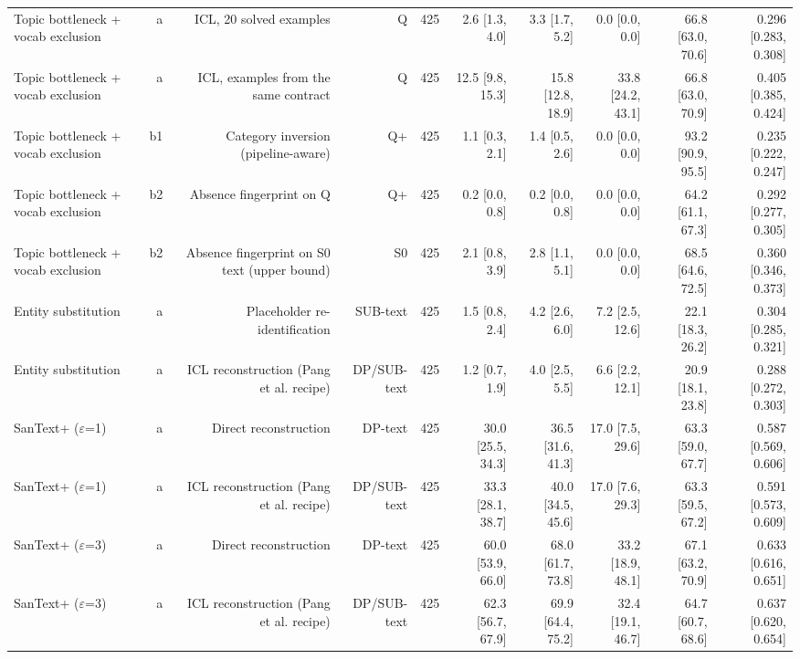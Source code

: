 \begin{table}[t]
\begin{tabular}{lrrrrrrrrr}
Topic bottleneck + vocab exclusion & a & ICL, 20 solved examples & Q & 425 & 2.6 [1.3, 4.0] & 3.3 [1.7, 5.2] & 0.0 [0.0, 0.0] & 66.8 [63.0, 70.6] & 0.296 [0.283, 0.308] \\
Topic bottleneck + vocab exclusion & a & ICL, examples from the same contract & Q & 425 & 12.5 [9.8, 15.3] & 15.8 [12.8, 18.9] & 33.8 [24.2, 43.1] & 66.8 [63.0, 70.9] & 0.405 [0.385, 0.424] \\
Topic bottleneck + vocab exclusion & b1 & Category inversion (pipeline-aware) & Q+ & 425 & 1.1 [0.3, 2.1] & 1.4 [0.5, 2.6] & 0.0 [0.0, 0.0] & 93.2 [90.9, 95.5] & 0.235 [0.222, 0.247] \\
Topic bottleneck + vocab exclusion & b2 & Absence fingerprint on Q & Q+ & 425 & 0.2 [0.0, 0.8] & 0.2 [0.0, 0.8] & 0.0 [0.0, 0.0] & 64.2 [61.1, 67.3] & 0.292 [0.277, 0.305] \\
Topic bottleneck + vocab exclusion & b2 & Absence fingerprint on S0 text (upper bound) & S0 & 425 & 2.1 [0.8, 3.9] & 2.8 [1.1, 5.1] & 0.0 [0.0, 0.0] & 68.5 [64.6, 72.5] & 0.360 [0.346, 0.373] \\
Entity substitution & a & Placeholder re-identification & SUB-text & 425 & 1.5 [0.8, 2.4] & 4.2 [2.6, 6.0] & 7.2 [2.5, 12.6] & 22.1 [18.3, 26.2] & 0.304 [0.285, 0.321] \\
Entity substitution & a & ICL reconstruction (Pang et al. recipe) & DP/SUB-text & 425 & 1.2 [0.7, 1.9] & 4.0 [2.5, 5.5] & 6.6 [2.2, 12.1] & 20.9 [18.1, 23.8] & 0.288 [0.272, 0.303] \\
SanText+ ($\varepsilon$=1) & a & Direct reconstruction & DP-text & 425 & 30.0 [25.5, 34.3] & 36.5 [31.6, 41.3] & 17.0 [7.5, 29.6] & 63.3 [59.0, 67.7] & 0.587 [0.569, 0.606] \\
SanText+ ($\varepsilon$=1) & a & ICL reconstruction (Pang et al. recipe) & DP/SUB-text & 425 & 33.3 [28.1, 38.7] & 40.0 [34.5, 45.6] & 17.0 [7.6, 29.3] & 63.3 [59.5, 67.2] & 0.591 [0.573, 0.609] \\
SanText+ ($\varepsilon$=3) & a & Direct reconstruction & DP-text & 425 & 60.0 [53.9, 66.0] & 68.0 [61.7, 73.8] & 33.2 [18.9, 48.1] & 67.1 [63.2, 70.9] & 0.633 [0.616, 0.651] \\
SanText+ ($\varepsilon$=3) & a & ICL reconstruction (Pang et al. recipe) & DP/SUB-text & 425 & 62.3 [56.7, 67.9] & 69.9 [64.4, 75.2] & 32.4 [19.1, 46.7] & 64.7 [60.7, 68.6] & 0.637 [0.620, 0.654] \\
\bottomrule
\end{tabular}
\end{table}

